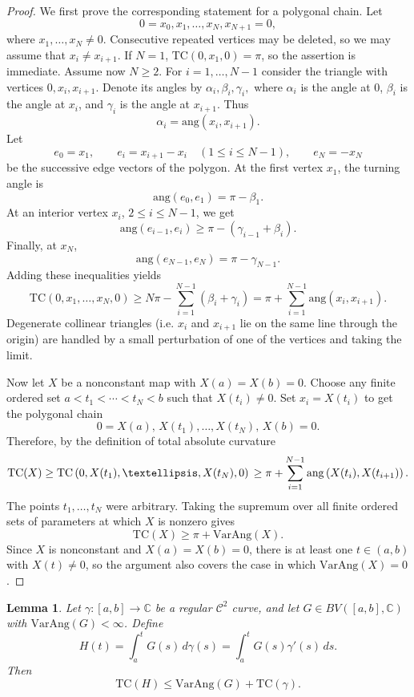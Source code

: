 \documentclass[10pt,a4paper]{amsart}
\newtheorem{lemma}[theorem]{Lemma}
\newcommand{\ang}{\mathrm{ang}}
\newcommand{\T}{\mathrm{TC}}
\newcommand{\VA}{\mathrm{VarAng}}
\newcommand{\cC}{\mathcal{C}}
\numberwithin{equation}{section}
\begin{document}
\begin{proof}
We first prove the corresponding statement for a polygonal chain. Let
\[0=x_0,x_1,\ldots,x_N,x_{N+1}=0,\]
where $x_1,\ldots,x_N\neq0$.  Consecutive repeated vertices may be deleted, so we may assume that $x_i\neq x_{i+1}$. If $N=1$, $\T(0,x_1,0)=\pi$, so the assertion is immediate. Assume now $N\ge 2$. For $i=1,\ldots,N-1$ consider the triangle with vertices $0,x_i,x_{i+1}$.  Denote its angles by $\alpha_i,\beta_i,\gamma_i,$ where $\alpha_i$ is the angle at $0$, $\beta_i$ is the angle at $x_i$, and $\gamma_i$ is the angle at $x_{i+1}$.  Thus
\[\alpha_i=\ang(x_i,x_{i+1}).\]
Let
\[e_0=x_1,\qquad e_i=x_{i+1}-x_i\quad(1\le i\le N-1),\qquad e_N=-x_N
\]
be the successive edge vectors of the polygon. At the first vertex $x_1$, the turning angle is
\[
    \ang(e_0,e_1)=\pi-\beta_1.
\]
At an interior vertex $x_i$, $2\le i\le N-1$, we get
\[\ang(e_{i-1},e_i)\ge \pi-(\gamma_{i-1}+\beta_i).
\]
Finally, at $x_N$,
\[\ang(e_{N-1},e_N)=\pi-\gamma_{N-1}.\]
Adding these inequalities yields
\[\T (0,x_1,\ldots,x_N,0)\ge
    N\pi-\sum_{i=1}^{N-1}(\beta_i+\gamma_i)=\pi+
    \sum_{i=1}^{N-1}
    \ang(x_i,x_{i+1}).
    \]
Degenerate collinear triangles (i.e. $x_i$ and $x_{i+1}$ lie on the same line through the origin) are handled by a small perturbation of one of the vertices and taking the limit.

Now let $X$ be a nonconstant map with $X(a)=X(b)=0$. Choose any finite ordered set $a<t_1<\cdots<t_N<b $ such that $X(t_i)\neq 0$. Set $x_i=X(t_i)$ to get the polygonal chain
\[
    0=X(a),\,X(t_1),\ldots,X(t_N),\,X(b)=0.
\]
Therefore, by the definition of total absolute curvature 
\[
    \T(X) \ge \T \left(0,X(t_1),\ldots,X(t_N),0\right)\\
    \ge \pi+\sum_{i=1}^{N-1} \ang\left(X(t_i),X(t_{i+1})\right).
\]
The points $t_1,\ldots,t_N$ were arbitrary.  Taking the supremum
over all finite ordered sets of parameters at which $X$ is nonzero
gives
\[\T(X)\ge \pi+\VA(X).\]
Since $X$ is nonconstant and $X(a)=X(b)=0$, there is at least one
$t\in(a,b)$ with $X(t)\neq0$, so the argument also covers the case
in which $\VA(X)=0$.
\end{proof}

\begin{lemma}\label{L2}
Let $\gamma:[a,b]\to\mathbb C$ be a regular $\cC^2$ curve, and let $G\in BV([a,b],\mathbb C)$ with $\VA(G)<\infty$. Define
\[
H(t)=\int_a^t G(s)\,d\gamma(s)
     =\int_a^t G(s)\gamma'(s)\,ds.
\]
Then
\[\T(H)\le \VA(G)+\T(\gamma).\]
\end{lemma}
\end{document}
